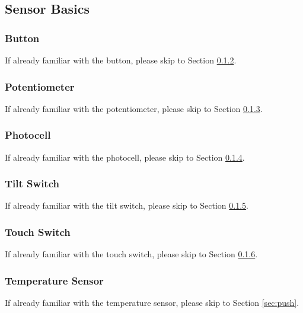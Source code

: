 \documentclass[12pt,letterpaper,oneside]{article}
\begin{document}
		\subsection{Sensor Basics}
			\subsubsection{Button}
			If already familiar with the button, please skip to Section \ref{sec:potentiometer}. 

			\subsubsection{Potentiometer} \label{sec:potentiometer}
			If already familiar with the potentiometer, please skip to Section \ref{sec:photocell}. 
			
			\subsubsection{Photocell} \label{sec:photocell}
			If already familiar with the photocell, please skip to Section \ref{sec:tilt}. 
			
			\subsubsection{Tilt Switch} \label{sec:tilt}
			If already familiar with the tilt switch, please skip to Section \ref{sec:touch}. 

			\subsubsection{Touch Switch} \label{sec:touch}
			If already familiar with the touch switch, please skip to Section \ref{sec:temp}. 
				
			\subsubsection{Temperature Sensor} \label{sec:temp}
			If already familiar with the temperature sensor, please skip to Section \ref{sec:push}. 
			
\end{document}
